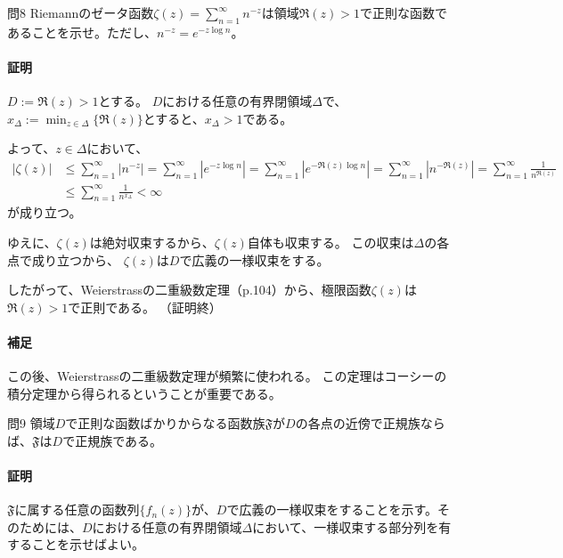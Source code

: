 \begin{mysimplebox}{問8}
    Riemannのゼータ函数$\zeta(z)=\sum_{n=1}^{\infty}n^{-z}$は領域$\Re(z)>1$で正則な函数であることを示せ。ただし、$n^{-z}=e^{-z\log n}$。
\end{mysimplebox}
\paragraph{証明}
$D:=\Re(z)>1$とする。
$D$における任意の有界閉領域$\Delta$で、$x_\Delta:=\min_{z\in\Delta}\{\Re(z)\}$とすると、$x_\Delta>1$である。

よって、$z\in\Delta$において、
\begin{align*}
    |\zeta(z)|&\le\sum_{n=1}^{\infty}|n^{-z}|
    =\sum_{n=1}^{\infty}|e^{-z\log n}|
    =\sum_{n=1}^{\infty}|e^{-\Re(z)\log n}|
    =\sum_{n=1}^{\infty}|n^{-\Re(z)}|
    =\sum_{n=1}^{\infty}\frac{1}{n^{\Re(z)}}\\
    &\le\sum_{n=1}^{\infty}\frac{1}{n^{x_\Delta}}
    <\infty
\end{align*}
が成り立つ。

ゆえに、$\zeta(z)$は絶対収束するから、$\zeta(z)$自体も収束する。
この収束は$\Delta$の各点で成り立つから、
$\zeta(z)$は$D$で広義の一様収束をする。

したがって、Weierstrassの二重級数定理（p.104）から、極限函数$\zeta(z)$は$\Re(z)>1$で正則である。
（証明終）

\paragraph{補足}
この後、Weierstrassの二重級数定理が頻繁に使われる。
この定理はコーシーの積分定理から得られるということが重要である。

\begin{mysimplebox}{問9}
    領域$D$で正則な函数ばかりからなる函数族$\mathfrak{F}$が$D$の各点の近傍で正規族ならば、$\mathfrak{F}$は$D$で正規族である。
\end{mysimplebox}
\paragraph{証明}
$\mathfrak{F}$に属する任意の函数列$\{f_n(z)\}$が、$D$で広義の一様収束をすることを示す。そのためには、$D$における任意の有界閉領域$\Delta$において、一様収束する部分列を有することを示せばよい。

